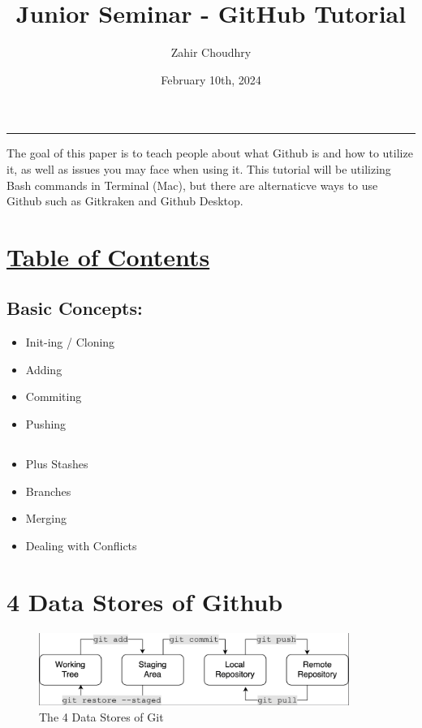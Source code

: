\documentclass{article}
\title{Junior Seminar - GitHub Tutorial}
\author{Zahir Choudhry}
\date{February 10th, 2024}
\begin{document}
\maketitle
\hrule

\vspace{15pt}
\centering The goal of this paper is to teach people about what Github is and how to utilize it, as well as issues you may face when using it.
This tutorial will be utilizing Bash commands in Terminal (Mac), but there are alternaticve ways to use Github such as Gitkraken and Github Desktop.

\vspace{15pt}

\section*{\underline{Table of Contents}}
\subsection*{{Basic Concepts:}}

\begin{itemize}
\item Init-ing / Cloning
\item Adding
\item Commiting
\item Pushing

\subsection*{}
\item Plus Stashes
\item Branches
\item Merging
\item Dealing with Conflicts
\end{itemize}

\vspace{50pt}   

\vspace{20pt}
\section*{4 Data Stores of Github}

\vspace{15pt}
\begin{figure}[h]
    \centering
    \includegraphics[width=0.9\textwidth]{Map.png}
    \caption{ The 4 Data Stores of Git}
    \label{fig:example}
\end{figure}
\end{document}
